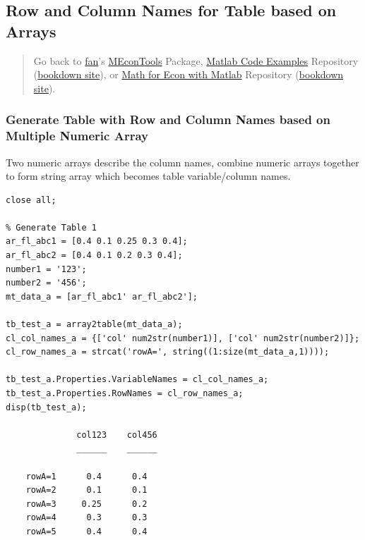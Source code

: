 \documentclass[
]{book}
\begin{document}
\hypertarget{row-and-column-names-for-table-based-on-arrays}{%
\subsection{Row and Column Names for Table based on Arrays}\label{row-and-column-names-for-table-based-on-arrays}}

\begin{quote}
Go back to \href{http://fanwangecon.github.io/}{fan}'s \href{https://fanwangecon.github.io/MEconTools/}{MEconTools} Package, \href{https://fanwangecon.github.io/M4Econ/}{Matlab Code Examples} Repository (\href{https://fanwangecon.github.io/M4Econ/bookdown}{bookdown site}), or \href{https://fanwangecon.github.io/Math4Econ/}{Math for Econ with Matlab} Repository (\href{https://fanwangecon.github.io/Math4Econ/bookdown}{bookdown site}).
\end{quote}

\hypertarget{generate-table-with-row-and-column-names-based-on-multiple-numeric-array}{%
\subsubsection{Generate Table with Row and Column Names based on Multiple Numeric Array}\label{generate-table-with-row-and-column-names-based-on-multiple-numeric-array}}

Two numeric arrays describe the column names, combine numeric arrays
together to form string array which becomes table variable/column names.

\begin{verbatim}
close all;

% Generate Table 1
ar_fl_abc1 = [0.4 0.1 0.25 0.3 0.4];
ar_fl_abc2 = [0.4 0.1 0.2 0.3 0.4];
number1 = '123';
number2 = '456';
mt_data_a = [ar_fl_abc1' ar_fl_abc2'];

tb_test_a = array2table(mt_data_a);
cl_col_names_a = {['col' num2str(number1)], ['col' num2str(number2)]};
cl_row_names_a = strcat('rowA=', string((1:size(mt_data_a,1))));

tb_test_a.Properties.VariableNames = cl_col_names_a;
tb_test_a.Properties.RowNames = cl_row_names_a;
disp(tb_test_a);

              col123    col456
              ______    ______

    rowA=1      0.4      0.4  
    rowA=2      0.1      0.1  
    rowA=3     0.25      0.2  
    rowA=4      0.3      0.3  
    rowA=5      0.4      0.4  
\end{verbatim}
\end{document}
